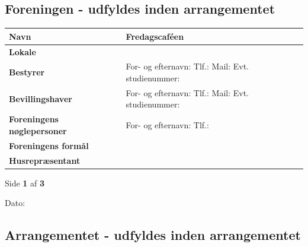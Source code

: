 \documentclass[a4paper, 11pt]{article}
\newcommand{\loglabel}[2][0.5cm]{\textbf{#2}\vspace{#1}}
\newcommand{\contactblock}[4]{%
    For- og efternavn: #1 \newline
    Tlf.: #2 \newline
    Mail: #3 \newline
    Evt. studienummer: #4%
}
\begin{document}
{{{{{{{{{{{{\subsection*{Foreningen - udfyldes inden arrangementet}

\begin{tabularx}{\textwidth}{|X|X|}
    \hline
    \loglabel{Navn} & Fredagscaféen \\ \hline
    \loglabel{Lokale} &  \\ \hline
    \loglabel{Bestyrer} & \contactblock{ }{ }{ }{ } \\ \hline
    \loglabel{Bevillingshaver} & \contactblock{ }{ }{ }{ } \\ \hline
    \loglabel{Foreningens nøglepersoner} &
        For- og efternavn:  \newline
        Tlf.: \\ \hline
    \loglabel{Foreningens formål} & \\ \hline
    \loglabel{Husrepræsentant} &  \\ \hline
\end{tabularx}

\vfill

\begin{center}
    Side \textbf{1} af \textbf{3}
\end{center}

\newpage

\noindent
\small{Dato: \textbf{ } }

\subsection*{Arrangementet - udfyldes inden arrangementet}

}}}}}}}}}}}}
\end{document}
